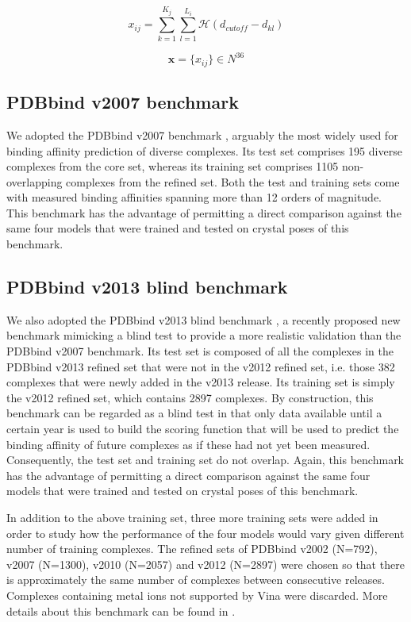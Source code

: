\documentclass[twocolumn]{bmcart}
\begin{document}
\begin{equation}
\label{rescoring2:x_ij}
x_{ij}=\sum_{k=1}^{K_j}\sum_{l=1}^{L_i}\mathcal{H}(d_{cutoff}-d_{kl})
\end{equation}

\begin{equation}
\label{rescoring2:x}
\mathbf x=\{x_{ij}\}\in N^{36}
\end{equation}

\subsection*{PDBbind v2007 benchmark}

We adopted the PDBbind v2007 benchmark \cite{1313}, arguably the most widely used \cite{1647,1432} for binding affinity prediction of diverse complexes. Its test set comprises 195 diverse complexes from the core set, whereas its training set comprises 1105 non-overlapping complexes from the refined set. Both the test and training sets come with measured binding affinities spanning more than 12 orders of magnitude. This benchmark has the advantage of permitting a direct comparison against the same four models that were trained and tested on crystal poses \cite{1647} of this benchmark.

\subsection*{PDBbind v2013 blind benchmark}

We also adopted the PDBbind v2013 blind benchmark \cite{1647}, a recently proposed new benchmark mimicking a blind test to provide a more realistic validation than the PDBbind v2007 benchmark. Its test set is composed of all the complexes in the PDBbind v2013 refined set that were not in the v2012 refined set, i.e. those 382 complexes that were newly added in the v2013 release. Its training set is simply the v2012 refined set, which contains 2897 complexes. By construction, this benchmark can be regarded as a blind test in that only data available until a certain year is used to build the scoring function that will be used to predict the binding affinity of future complexes as if these had not yet been measured. Consequently, the test set and training set do not overlap. Again, this benchmark has the advantage of permitting a direct comparison against the same four models that were trained and tested on crystal poses \cite{1647} of this benchmark.

In addition to the above training set, three more training sets were added in order to study how the performance of the four models would vary given different number of training complexes. The refined sets of PDBbind v2002 (N=792), v2007 (N=1300), v2010 (N=2057) and v2012 (N=2897) were chosen so that there is approximately the same number of complexes between consecutive releases. Complexes containing metal ions not supported by Vina were discarded. More details about this benchmark can be found in \cite{1647}.
\end{document}
